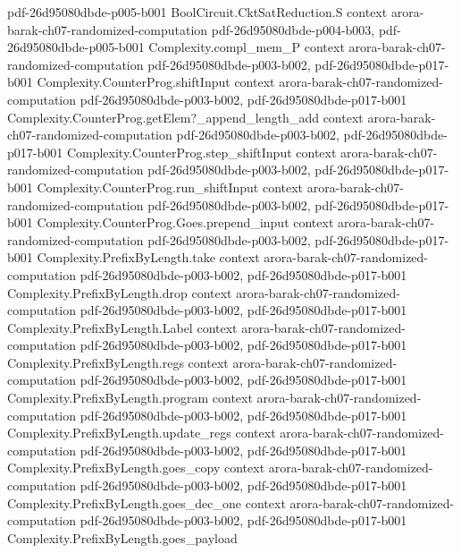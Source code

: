 \begin{theorem}
{    pdf-26d95080dbde-p005-b001}
\proofstep
  {BoolCircuit.CktSatReduction.S}
  {context}
  {arora-barak-ch07-randomized-computation}
  {pdf-26d95080dbde-p004-b003,
    pdf-26d95080dbde-p005-b001}
\proofstep
  {Complexity.compl_mem_P}
  {context}
  {arora-barak-ch07-randomized-computation}
  {pdf-26d95080dbde-p003-b002,
    pdf-26d95080dbde-p017-b001}
\proofstep
  {Complexity.CounterProg.shiftInput}
  {context}
  {arora-barak-ch07-randomized-computation}
  {pdf-26d95080dbde-p003-b002,
    pdf-26d95080dbde-p017-b001}
\proofstep
  {Complexity.CounterProg.getElem?_append_length_add}
  {context}
  {arora-barak-ch07-randomized-computation}
  {pdf-26d95080dbde-p003-b002,
    pdf-26d95080dbde-p017-b001}
\proofstep
  {Complexity.CounterProg.step_shiftInput}
  {context}
  {arora-barak-ch07-randomized-computation}
  {pdf-26d95080dbde-p003-b002,
    pdf-26d95080dbde-p017-b001}
\proofstep
  {Complexity.CounterProg.run_shiftInput}
  {context}
  {arora-barak-ch07-randomized-computation}
  {pdf-26d95080dbde-p003-b002,
    pdf-26d95080dbde-p017-b001}
\proofstep
  {Complexity.CounterProg.Goes.prepend_input}
  {context}
  {arora-barak-ch07-randomized-computation}
  {pdf-26d95080dbde-p003-b002,
    pdf-26d95080dbde-p017-b001}
\proofstep
  {Complexity.PrefixByLength.take}
  {context}
  {arora-barak-ch07-randomized-computation}
  {pdf-26d95080dbde-p003-b002,
    pdf-26d95080dbde-p017-b001}
\proofstep
  {Complexity.PrefixByLength.drop}
  {context}
  {arora-barak-ch07-randomized-computation}
  {pdf-26d95080dbde-p003-b002,
    pdf-26d95080dbde-p017-b001}
\proofstep
  {Complexity.PrefixByLength.Label}
  {context}
  {arora-barak-ch07-randomized-computation}
  {pdf-26d95080dbde-p003-b002,
    pdf-26d95080dbde-p017-b001}
\proofstep
  {Complexity.PrefixByLength.regs}
  {context}
  {arora-barak-ch07-randomized-computation}
  {pdf-26d95080dbde-p003-b002,
    pdf-26d95080dbde-p017-b001}
\proofstep
  {Complexity.PrefixByLength.program}
  {context}
  {arora-barak-ch07-randomized-computation}
  {pdf-26d95080dbde-p003-b002,
    pdf-26d95080dbde-p017-b001}
\proofstep
  {Complexity.PrefixByLength.update_regs}
  {context}
  {arora-barak-ch07-randomized-computation}
  {pdf-26d95080dbde-p003-b002,
    pdf-26d95080dbde-p017-b001}
\proofstep
  {Complexity.PrefixByLength.goes_copy}
  {context}
  {arora-barak-ch07-randomized-computation}
  {pdf-26d95080dbde-p003-b002,
    pdf-26d95080dbde-p017-b001}
\proofstep
  {Complexity.PrefixByLength.goes_dec_one}
  {context}
  {arora-barak-ch07-randomized-computation}
  {pdf-26d95080dbde-p003-b002,
    pdf-26d95080dbde-p017-b001}
\proofstep
  {Complexity.PrefixByLength.goes_payload}

\end{theorem}
